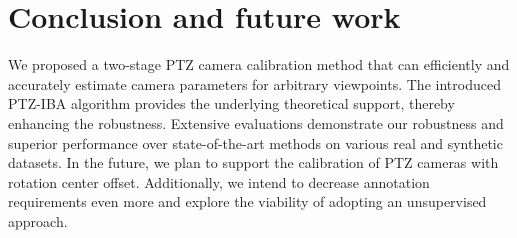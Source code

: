 \section{Conclusion and future work}

We proposed a two-stage PTZ camera calibration method that can efficiently and accurately estimate camera parameters for arbitrary viewpoints. The introduced PTZ-IBA algorithm provides the underlying theoretical support, thereby enhancing the robustness. Extensive evaluations demonstrate our robustness and superior performance over state-of-the-art methods on various real and synthetic datasets. 
In the future, we plan to support the calibration of PTZ cameras with rotation center offset. Additionally, we intend to decrease annotation requirements even more and explore the viability of adopting an unsupervised approach.